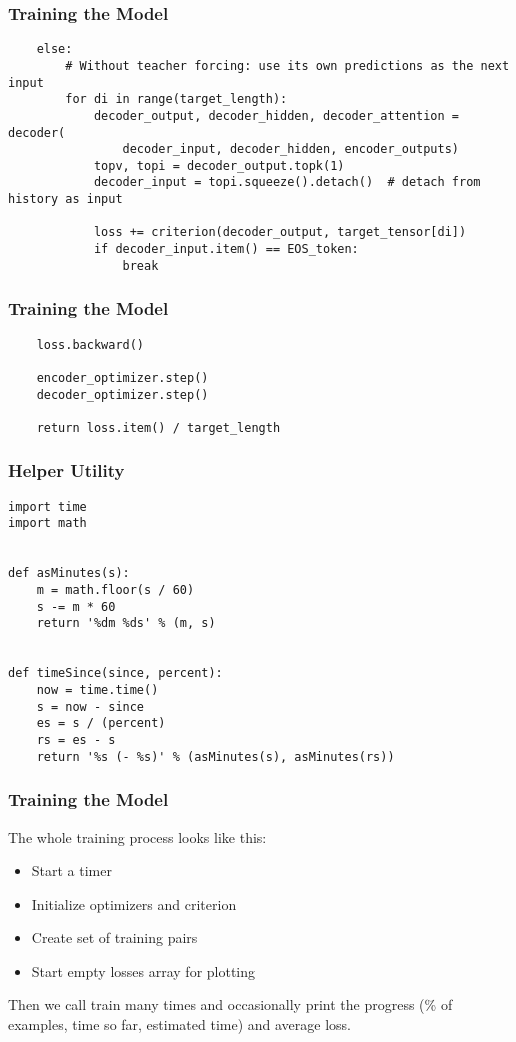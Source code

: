 \begin{frame}[fragile]
\frametitle{Training the Model}
\begin{lstlisting}    
    else:
        # Without teacher forcing: use its own predictions as the next input
        for di in range(target_length):
            decoder_output, decoder_hidden, decoder_attention = decoder(
                decoder_input, decoder_hidden, encoder_outputs)
            topv, topi = decoder_output.topk(1)
            decoder_input = topi.squeeze().detach()  # detach from history as input

            loss += criterion(decoder_output, target_tensor[di])
            if decoder_input.item() == EOS_token:
                break
\end{lstlisting} 
              
\end{frame} 


\begin{frame}[fragile]
\frametitle{Training the Model}
\begin{lstlisting}    
    loss.backward()

    encoder_optimizer.step()
    decoder_optimizer.step()

    return loss.item() / target_length
\end{lstlisting} 
              
\end{frame} 

\begin{frame}[fragile]
\frametitle{Helper Utility}
\begin{lstlisting}    
import time
import math


def asMinutes(s):
    m = math.floor(s / 60)
    s -= m * 60
    return '%dm %ds' % (m, s)


def timeSince(since, percent):
    now = time.time()
    s = now - since
    es = s / (percent)
    rs = es - s
    return '%s (- %s)' % (asMinutes(s), asMinutes(rs))
\end{lstlisting} 
              
\end{frame} 

\begin{frame}[fragile]
\frametitle{Training the Model}
The whole training process looks like this:
\begin{itemize}
\item Start a timer
\item Initialize optimizers and criterion
\item Create set of training pairs
\item Start empty losses array for plotting
\end{itemize}
Then we call train many times and occasionally print the progress (\% of examples, time so far, estimated time) and average loss.              
\end{frame} 


